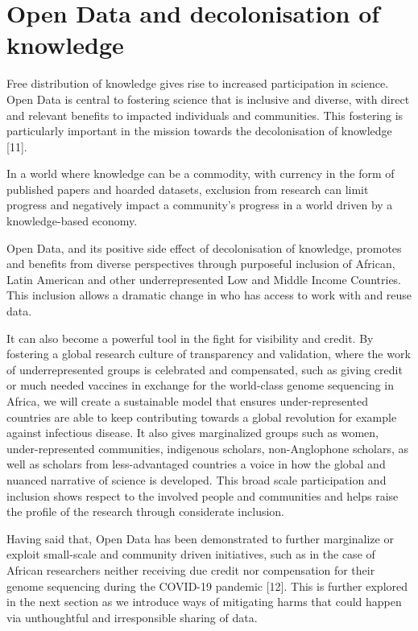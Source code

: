 \documentclass[
  letterpaper,
  DIV=11,
  numbers=noendperiod]{scrreport}
\begin{document}
\hypertarget{open-data-and-decolonisation-of-knowledge}{%
\section{Open Data and decolonisation of
knowledge}\label{open-data-and-decolonisation-of-knowledge}}

Free distribution of knowledge gives rise to increased participation in
science. Open Data is central to fostering science that is inclusive and
diverse, with direct and relevant benefits to impacted individuals and
communities. This fostering is particularly important in the mission
towards the decolonisation of knowledge {[}11{]}.

In a world where knowledge can be a commodity, with currency in the form
of published papers and hoarded datasets, exclusion from research can
limit progress and negatively impact a community's progress in a world
driven by a knowledge-based economy.

Open Data, and its positive side effect of decolonisation of knowledge,
promotes and benefits from diverse perspectives through purposeful
inclusion of African, Latin American and other underrepresented Low and
Middle Income Countries. This inclusion allows a dramatic change in who
has access to work with and reuse data.

It can also become a powerful tool in the fight for visibility and
credit. By fostering a global research culture of transparency and
validation, where the work of underrepresented groups is celebrated and
compensated, such as giving credit or much needed vaccines in exchange
for the world-class genome sequencing in Africa, we will create a
sustainable model that ensures under-represented countries are able to
keep contributing towards a global revolution for example against
infectious disease. It also gives marginalized groups such as women,
under-represented communities, indigenous scholars, non-Anglophone
scholars, as well as scholars from less-advantaged countries a voice in
how the global and nuanced narrative of science is developed. This broad
scale participation and inclusion shows respect to the involved people
and communities and helps raise the profile of the research through
considerate inclusion.

Having said that, Open Data has been demonstrated to further marginalize
or exploit small-scale and community driven initiatives, such as in the
case of African researchers neither receiving due credit nor
compensation for their genome sequencing during the COVID-19 pandemic
{[}12{]}. This is further explored in the next section as we introduce
ways of mitigating harms that could happen via unthoughtful and
irresponsible sharing of data.
\end{document}
